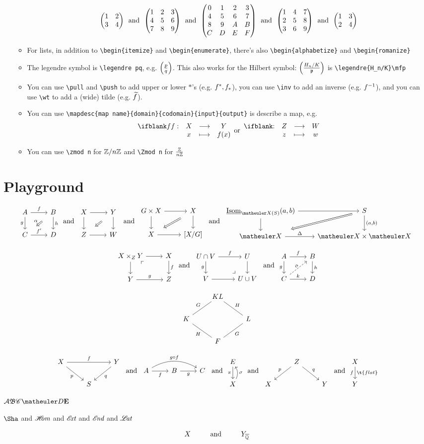 \documentclass{article}
\numberwithin{thm}{section}
\numberwithin{prob}{section}
\numberwithin{equation}{section}
\begin{document}
\begin{itemize}
\begin{itemize}
        $$\mat1234\tand\Mat123456789\tand\MAT0123456789ABCDEF\tand\Matt123456789\tand\matt1234$$
        \item For lists, in addition to \verb+\begin{itemize}+ and \verb+\begin{enumerate}+, there's also \verb+\begin{alphabetize}+ and \verb+\begin{romanize}+
        \item The legendre symbol is \verb+\legendre pq+, e.g. $\legendre pq$. This also works for the Hilbert symbol: $\legendre{H_n/K}\mfp$ is \verb+\legendre{H_n/K}\mfp+
        \item You can use \verb+\pull+ and \verb+\push+ to add upper or lower $*$'s (e.g. $\pull f,\push f$), you can use \verb+\inv+ to add an inverse (e.g. $\inv f$), and you can use \verb+\wt+ to add a (wide) tilde (e.g. $\wt f$).
        \item You can use \verb+\mapdesc{map name}{domain}{codomain}{input}{output}+ is describe a map, e.g.
        $$\mapdesc fXYx{f(x)}\tor\mapdesc{}ZWzw$$
        \item You can use \verb+\zmod n+ for $\zmod n$ and \verb+\Zmod n+ for $\Zmod n$
    \end{itemize}
\end{itemize}

\newpage
\section{Playground}

$$\twocommsquare AfBghC{f'}D\alpha\tand\baretwocommsquare XYZW\tand\baretwocommsquare{G\by X}XX{[X/G]}\tand\twocommsquare{\ul\Isom_{\meX(S)}(a,b)}{}S{}{(a,b)}\meX\Delta{\meX\by\meX}{}$$

$$\pullback {X\by_ZY}XfYgZ\tand\pushout {U\cap V}fUgV{U\cup V}\tand\liftsquare AfBghCkD\alpha$$

$$\galoisdiamond{KL}GHKLHGF$$

$$\mapover XfYpqS\tand\compdiag AfBgC{g\circ f}\tand\mapwithsect E\pi X\sigma\tand\correspondence ZpqXY\tand\mapdown Xf{\t{flat}}Y$$

$\mcA\mf B\msC\meD\mbf E$

$\Sha$ and $\sHom$ and $\sExt$ and $\sEnd$ and $\sLat$

$$X\Text{and}\sspacing Y_\Qbar$$
\end{document}
